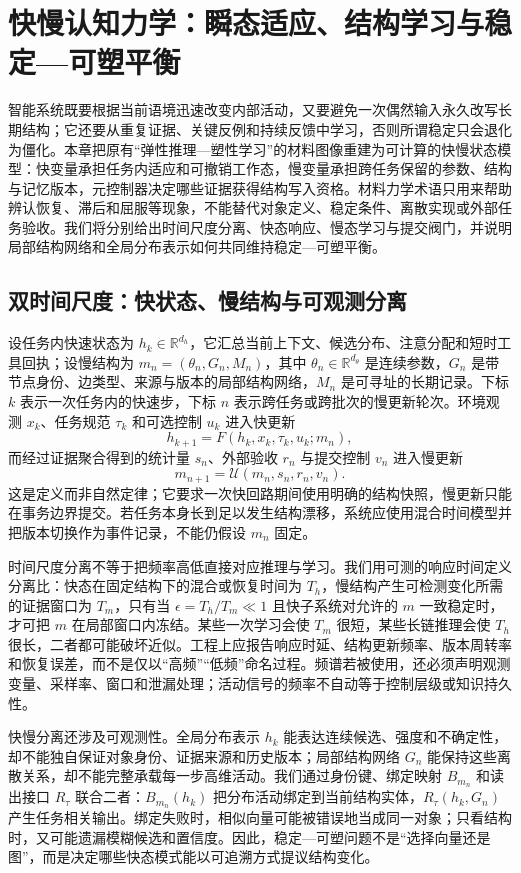 \chapter{快慢认知力学：瞬态适应、结构学习与稳定—可塑平衡}
\label{chp:cognitive_mechanics}

智能系统既要根据当前语境迅速改变内部活动，又要避免一次偶然输入永久改写长期结构；它还要从重复证据、关键反例和持续反馈中学习，否则所谓稳定只会退化为僵化。本章把原有“弹性推理—塑性学习”的材料图像重建为可计算的快慢状态模型：快变量承担任务内适应和可撤销工作态，慢变量承担跨任务保留的参数、结构与记忆版本，元控制器决定哪些证据获得结构写入资格。材料力学术语只用来帮助辨认恢复、滞后和屈服等现象，不能替代对象定义、稳定条件、离散实现或外部任务验收。我们将分别给出时间尺度分离、快态响应、慢态学习与提交阀门，并说明局部结构网络和全局分布表示如何共同维持稳定—可塑平衡。

\section{双时间尺度：快状态、慢结构与可观测分离}
\label{sec:section_3162}

设任务内快速状态为 $h_k\in\mathbb R^{d_h}$，它汇总当前上下文、候选分布、注意分配和短时工具回执；设慢结构为 $m_n=(\theta_n,G_n,M_n)$，其中 $\theta_n\in\mathbb R^{d_\theta}$ 是连续参数，$G_n$ 是带节点身份、边类型、来源与版本的局部结构网络，$M_n$ 是可寻址的长期记录。下标 $k$ 表示一次任务内的快速步，下标 $n$ 表示跨任务或跨批次的慢更新轮次。环境观测 $x_k$、任务规范 $\tau_k$ 和可选控制 $u_k$ 进入快更新
\[
h_{k+1}=F(h_k,x_k,\tau_k,u_k;m_n),
\]
而经过证据聚合得到的统计量 $s_n$、外部验收 $r_n$ 与提交控制 $v_n$ 进入慢更新
\[
m_{n+1}=\mathcal U(m_n,s_n,r_n,v_n).
\]
这是定义而非自然定律；它要求一次快回路期间使用明确的结构快照，慢更新只能在事务边界提交。若任务本身长到足以发生结构漂移，系统应使用混合时间模型并把版本切换作为事件记录，不能仍假设 $m_n$ 固定。

时间尺度分离不等于把频率高低直接对应推理与学习。我们用可测的响应时间定义分离比：快态在固定结构下的混合或恢复时间为 $T_h$，慢结构产生可检测变化所需的证据窗口为 $T_m$，只有当 $\epsilon=T_h/T_m\ll1$ 且快子系统对允许的 $m$ 一致稳定时，才可把 $m$ 在局部窗口内冻结。某些一次学习会使 $T_m$ 很短，某些长链推理会使 $T_h$ 很长，二者都可能破坏近似。工程上应报告响应时延、结构更新频率、版本周转率和恢复误差，而不是仅以“高频”“低频”命名过程。频谱若被使用，还必须声明观测变量、采样率、窗口和泄漏处理；活动信号的频率不自动等于控制层级或知识持久性。

快慢分离还涉及可观测性。全局分布表示 $h_k$ 能表达连续候选、强度和不确定性，却不能独自保证对象身份、证据来源和历史版本；局部结构网络 $G_n$ 能保持这些离散关系，却不能完整承载每一步高维活动。我们通过身份键、绑定映射 $B_{m_n}$ 和读出接口 $R_{\tau}$ 联合二者：$B_{m_n}(h_k)$ 把分布活动绑定到当前结构实体，$R_{\tau}(h_k,G_n)$ 产生任务相关输出。绑定失败时，相似向量可能被错误地当成同一对象；只看结构时，又可能遗漏模糊候选和置信度。因此，稳定—可塑问题不是“选择向量还是图”，而是决定哪些快态模式能以可追溯方式提议结构变化。


